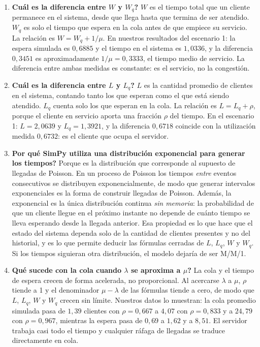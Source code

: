 \documentclass[11pt,a4paper]{article}
\begin{document}
\begin{enumerate}
    \item \textbf{\textquestiondown{}Cuál es la diferencia entre $W$ y $W_q$?}
    $W$ es el tiempo total que un cliente permanece en el sistema, desde que llega hasta
    que termina de ser atendido. $W_q$ es solo el tiempo que espera en la cola antes de
    que empiece su servicio. La relación es $W = W_q + 1/\mu$. En nuestros resultados del
    escenario 1: la espera simulada es $0{,}6885$ y el tiempo en el sistema es
    $1{,}0336$, y la diferencia $0{,}3451$ es aproximadamente $1/\mu = 0{,}3333$, el
    tiempo medio de servicio. La diferencia entre ambas medidas es constante: es el
    servicio, no la congestión.

    \item \textbf{\textquestiondown{}Cuál es la diferencia entre $L$ y $L_q$?}
    $L$ es la cantidad promedio de clientes en el sistema, contando tanto los que esperan
    como el que está siendo atendido. $L_q$ cuenta solo los que esperan en la cola. La
    relación es $L = L_q + \rho$, porque el cliente en servicio aporta una fracción
    $\rho$ del tiempo. En el escenario 1: $L = 2{,}0639$ y $L_q = 1{,}3921$, y la
    diferencia $0{,}6718$ coincide con la utilización medida $0{,}6732$: es el cliente
    que ocupa el servidor.

    \item \textbf{\textquestiondown{}Por qué SimPy utiliza una distribución exponencial para generar los tiempos?}
    Porque es la distribución que corresponde al supuesto de llegadas de Poisson. En un
    proceso de Poisson los tiempos \emph{entre} eventos consecutivos se distribuyen
    exponencialmente, de modo que generar intervalos exponenciales es la forma de
    construir llegadas de Poisson. Además, la exponencial es la única distribución
    continua \emph{sin memoria}: la probabilidad de que un cliente llegue en el próximo
    instante no depende de cuánto tiempo se lleva esperando desde la llegada anterior.
    Esa propiedad es lo que hace que el estado del sistema dependa solo de la cantidad de
    clientes presentes y no del historial, y es lo que permite deducir las fórmulas
    cerradas de $L$, $L_q$, $W$ y $W_q$. Si los tiempos siguieran otra distribución, el
    modelo dejaría de ser M/M/1.

    \item \textbf{\textquestiondown{}Qué sucede con la cola cuando $\lambda$ se aproxima a $\mu$?}
    La cola y el tiempo de espera crecen de forma acelerada, no proporcional. Al acercarse
    $\lambda$ a $\mu$, $\rho$ tiende a 1 y el denominador $\mu - \lambda$ de las fórmulas
    tiende a cero, de modo que $L$, $L_q$, $W$ y $W_q$ crecen sin límite. Nuestros datos
    lo muestran: la cola promedio simulada pasa de $1{,}39$ clientes con $\rho = 0{,}667$
    a $4{,}07$ con $\rho = 0{,}833$ y a $24{,}79$ con $\rho = 0{,}967$, mientras la espera
    pasa de $0{,}69$ a $1{,}62$ y a $8{,}51$. El servidor trabaja casi todo el tiempo y
    cualquier ráfaga de llegadas se traduce directamente en cola.


\end{enumerate}
\end{document}
